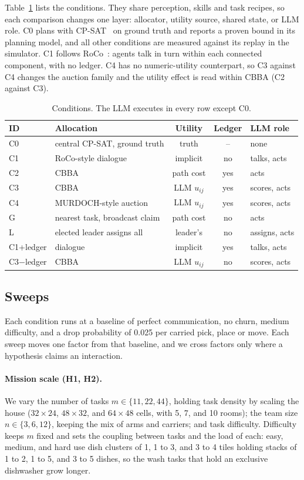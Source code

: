 \documentclass[letterpaper]{article}
\begin{document}
Table~\ref{tab:conditions} lists the conditions. They share perception, skills and task recipes, so each comparison changes one layer: allocator, utility source, shared state, or LLM role. C0 plans with CP-SAT~\citep{perron2023cpsat,perron2026cpsat} on ground truth and reports a proven bound in its planning model, and all other conditions are measured against its replay in the simulator. C1 follows RoCo~\citep{mandi2024roco}: agents talk in turn within each connected component, with no ledger. C4 has no numeric-utility counterpart, so C3 against C4 changes the auction family and the utility effect is read within CBBA (C2 against C3).

\begin{table}[t]
\centering\small
\begin{tabular}{@{}llccl@{}}
\toprule
ID & Allocation & Utility & Ledger & LLM role \\
\midrule
C0 & central CP-SAT, ground truth & truth & -- & none \\
C1 & RoCo-style dialogue & implicit & no & talks, acts \\
C2 & CBBA & path cost & yes & acts \\
C3 & CBBA & LLM $u_{ij}$ & yes & scores, acts \\
C4 & MURDOCH-style auction & LLM $u_{ij}$ & yes & scores, acts \\
G & nearest task, broadcast claim & path cost & no & acts \\
L & elected leader assigns all & leader's & no & assigns, acts \\
C1+ledger & dialogue & implicit & yes & talks, acts \\
C3$-$ledger & CBBA & LLM $u_{ij}$ & no & scores, acts \\
\bottomrule
\end{tabular}
\caption{Conditions. The LLM executes in every row except C0.}
\label{tab:conditions}
\end{table}

\subsection{Sweeps}

Each condition runs at a baseline of perfect communication, no churn, medium difficulty, and a drop probability of 0.025 per carried pick, place or move. Each sweep moves one factor from that baseline, and we cross factors only where a hypothesis claims an interaction.

\paragraph{Mission scale (H1, H2).}
We vary the number of tasks $m\in\{11,22,44\}$, holding task density by scaling the house ($32\times24$, $48\times32$, and $64\times48$ cells, with 5, 7, and 10 rooms); the team size $n\in\{3,6,12\}$, keeping the mix of arms and carriers; and task difficulty. Difficulty keeps $m$ fixed and sets the coupling between tasks and the load of each: easy, medium, and hard use dish clusters of 1, 1 to 3, and 3 to 4 tiles holding stacks of 1 to 2, 1 to 5, and 3 to 5 dishes, so the wash tasks that hold an exclusive dishwasher grow longer.
\end{document}
